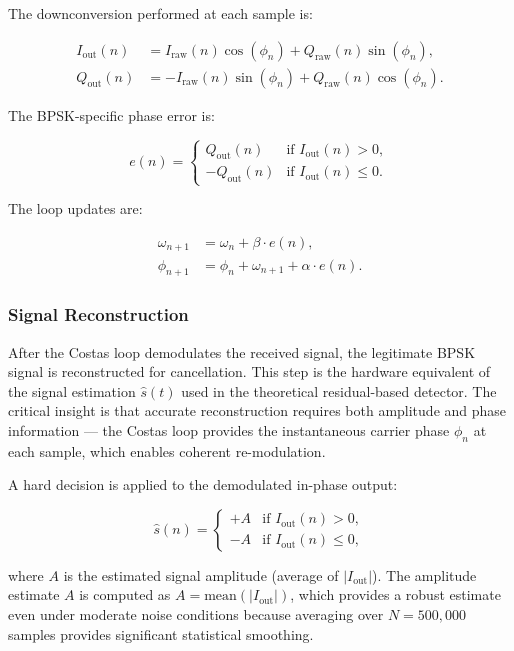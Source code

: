 \documentclass{article}
\begin{document}
The downconversion performed at each sample is:

\begin{align}
I_{\text{out}}(n) &= I_{\text{raw}}(n) \cos(\phi_n) + Q_{\text{raw}}(n) \sin(\phi_n), \\
Q_{\text{out}}(n) &= -I_{\text{raw}}(n) \sin(\phi_n) + Q_{\text{raw}}(n) \cos(\phi_n).
\end{align}

The BPSK-specific phase error is:

\begin{equation}
e(n) = \begin{cases}
Q_{\text{out}}(n) & \text{if } I_{\text{out}}(n) > 0, \\
-Q_{\text{out}}(n) & \text{if } I_{\text{out}}(n) \le 0.
\end{cases}
\end{equation}

The loop updates are:

\begin{align}
\omega_{n+1} &= \omega_n + \beta \cdot e(n), \\
\phi_{n+1} &= \phi_n + \omega_{n+1} + \alpha \cdot e(n).
\end{align}

\subsubsection{Signal Reconstruction}

After the Costas loop demodulates the received signal, the legitimate BPSK signal is reconstructed for cancellation. This step is the hardware equivalent of the signal estimation $\hat{s}(t)$ used in the theoretical residual-based detector. The critical insight is that accurate reconstruction requires both amplitude and phase information — the Costas loop provides the instantaneous carrier phase $\phi_n$ at each sample, which enables coherent re-modulation.

A hard decision is applied to the demodulated in-phase output:

\begin{equation}
\hat{s}(n) = \begin{cases}
+A & \text{if } I_{\text{out}}(n) > 0, \\
-A & \text{if } I_{\text{out}}(n) \le 0,
\end{cases}
\end{equation}

where $A$ is the estimated signal amplitude (average of $|I_{\text{out}}|$). The amplitude estimate $A$ is computed as $A = \text{mean}(|I_{\text{out}}|)$, which provides a robust estimate even under moderate noise conditions because averaging over $N = 500{,}000$ samples provides significant statistical smoothing.
\end{document}
